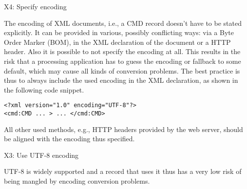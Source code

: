 X4: Specify encoding


The encoding of XML documents, i.e., a CMD record doesn't have to be stated explicitly. It can be provided in various, possibly conflicting ways: via a Byte Order Marker (BOM), in the XML declaration of the document or a HTTP header. Also it is possible to not specify the encoding at all. This results in the risk that a processing application has to guess the encoding or fallback to some default, which may cause all kinds of conversion problems. The best practice is thus to always include the used encoding in the XML declaration, as shown in the following code snippet.

\lstset{language=XML}
\begin{lstlisting}
<?xml version="1.0" encoding="UTF-8"?>
<cmd:CMD ... > ... </cmd:CMD>
\end{lstlisting}

All other used methods, e.g., HTTP headers provided by the web server, should be aligned with the encoding thus specified.

X3: Use UTF-8 encoding


UTF-8\cite{rfc3629} is widely supported and a record that uses it thus has a very low risk of being mangled by encoding conversion problems.